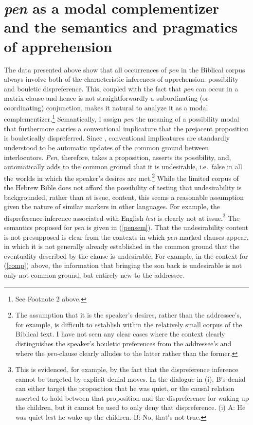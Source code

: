 \documentclass[output=paper,colorlinks,citecolor=brown]{langscibook}
\begin{document}
\section{\textit{pen} as a modal complementizer and the semantics and pragmatics of apprehension}
\label{sec:analysis}
The data presented above show that all occurrences of \textit{pen} in the Biblical corpus always involve both of the characteristic inferences of apprehension: possibility and bouletic dispreference. This, coupled with the fact that \textit{pen} can occur in a matrix clause and hence is not straightforwardly a subordinating (or coordinating) conjunction, makes it natural to analyze it as a modal complementizer.\footnote{See Footnote 2 above.} Semantically, I assign \textit{pen} the meaning of a possibility modal that furthermore carries a conventional implicature that the prejacent proposition is bouletically dispreferred. Since \citet{karttunen-peters}, conventional implicatures are  standardly understood to be automatic updates of the common ground between interlocutors. \textit{Pen}, therefore, takes a proposition, asserts its possibility, and, automatically adds to the common ground that it is  undesirable, i.e.\ false in all the worlds in which the speaker's desires are met.\footnote{The assumption that it is the speaker's desires, rather than the addressee's, for example, is difficult to establish within the relatively small corpus of the Biblical text. I have not seen any clear cases where the context clearly distinguishes the speaker's bouletic preferences from the addressee's and where the \textit{pen}-clause clearly alludes to the latter rather than the former.} While the limited corpus of the Hebrew Bible does not afford the possibility of testing that undesirability is backgrounded, rather than at issue, content, this seems a reasonable assumption given the nature of similar markers in other languages. For example, the dispreference inference associated with English \textit{lest} is clearly not at issue.\footnote{This is evidenced, for example, by the fact that the dispreference inference cannot be targeted by explicit denial moves. In the dialogue in (i), B's denial can either target the proposition that he was quiet, or the causal relation asserted to hold between that proposition and the dispreference for waking up the children, but it cannot be used to only deny that dispreference. (i) A: He was quiet lest he wake up the children. B: No, that's not true.} The semantics proposed for \textit{pen} is given in (\ref{pensem}). That the  undesirability content is not presupposed is clear from the contexts in which \textit{pen}-marked clauses appear, in which it is not generally already established in the common ground that the eventuality described by the clause is undesirable. For example, in the context for (\ref{comp}) above, the information that bringing the son back is undesirable is not only not common ground, but entirely new to the addressee. 
\end{document}
